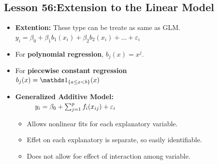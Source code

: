 \documentclass[10pt, french]{article}
\begin{document}
\begin{multicols*}{3}
\section*{Lesson 56:Extension to the Linear Model}
\begin{itemize}[align=left,leftmargin=*]
   \item \textbf{Extention:} These type can be treate as same as GLM. $y_i = \beta_0 + \beta_1 b_1(x_i) + \beta_2 b_2(x_i) + ... + \varepsilon_i$
   \item[] For \textbf{polynomial regression}, $b_j(x) = x^j$.
   \item[] For \textbf{piecewise constant regression} \\ $ b_j(x) = \indic{a\leq x<b}(x) $
   \item \textbf{Generalized Additive Model:} \\
   $\hspace*{1cm} y_i = \beta_0 + \sum_{j=1}^p f_i(x_{ij}) + \varepsilon_i$
   \begin{itemize}
      \item Allows nonlinear fits for each explanatory variable.
      \item Effet on each explanatory is separate, so easily identifiable.
      \item Does not allow foe effect of interaction among variable. 
   \end{itemize}
\end{itemize}


\def\SectionColor{green!80!black}

\end{multicols*}
\end{document}
